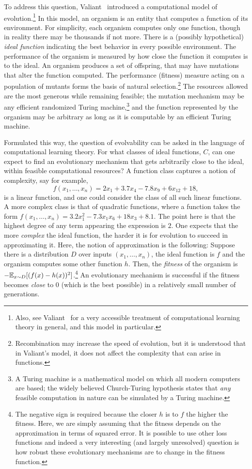 \documentclass{acmtr2e}
\begin{document}
To address this question, Valiant~\cite{Valiant:2009-evolvability} introduced a
computational model of evolution.\footnote{Also, see
Valiant~\cite{Valiant:2013-PAC} for a very accessible treatment of computational
learning theory in general, and this model in particular.} In this model, an
organism is an entity that computes a function of its environment. For
simplicity, each organism computes only one function, though in reality there
may be thousands if not more. There is a (possibly hypothetical) \emph{ideal
function} indicating the best behavior in every possible environment. The
performance of the organism is measured by how close the function it computes is
to the ideal. An organism produces a set of offspring, that may have mutations
that  alter the function computed. The performance (fitness) measure acting on a
population of mutants forms the basis of natural
selection.\footnote{Recombination may increase the speed of evolution, but it is
understood that in Valiant's model, it does not affect the complexity that can
arise in functions.} The resources allowed are the most generous while remaining
feasible; the mutation mechanism may be any efficient randomized Turing
machine,\footnote{A Turing machine is a mathematical model on which all modern
computers are based; the widely believed Church-Turing hypothesis states that
\emph{any} feasible computation in nature can be simulated by a Turing machine.}
and the function represented by the organism may be arbitrary as long as it is
computable by an efficient Turing machine.

Formulated this way, the question of evolvability can be asked in the language
of computational learning theory. For what classes of ideal functions, $C$, can
one expect to find an evolutionary mechanism that gets arbitrarily close to the
ideal, within feasible computational resources? A function class captures a
notion of complexity, say for example,
\[ f(x_1, \ldots, x_n) = 2 x_1 + 3.7 x_4 - 7.8 x_9 + 6 x_{12} + 18, \]
is a linear function, and one could consider the class of all such linear
functions. A more complex class is that of quadratic functions, where a function
takes the form $f(x_1, \ldots, x_n) = 3.2 x_1^2 - 7.3 x_1 x_6 + 18 x_3 + 8.1$.
The point here is that the highest degree of any term appearing the expression
is $2$. One expects that the more \emph{complex} the ideal function, the harder
it is for evolution to succeed in approximating it. Here, the notion of
approximation is the following: Suppose there is a distribution $D$ over inputs
$(x_1, \ldots, x_n)$, the ideal function is $f$ and the organism computes some
other function $h$. Then, the \emph{fitness} of the organism is $ - \mathbb{E}_{x \sim
D}[(f(x) - h(x))^2]$.\footnote{The negative sign is required because the closer
$h$ is to $f$ the higher the fitness. Here, we are simply assuming that the
fitness depends on the approximation in terms of squared error. It is possible
to use other loss functions and indeed a very interesting (and largely
unresolved) question is how robust these evolutionary mechanisms are to change
in the fitness function.} An evolutionary mechanism is successful if the fitness
becomes \emph{close} to $0$ (which is the best possible) in a relatively small
number of generations.
\end{document}
